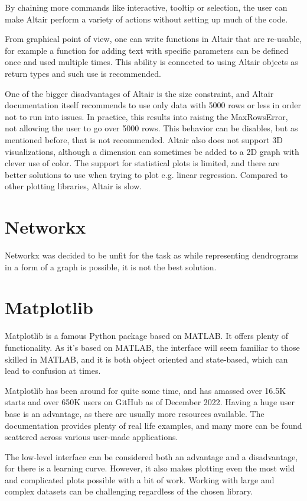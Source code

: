 By chaining more commands like interactive, tooltip or selection, the user can make Altair perform a variety of actions without setting up much of the code. 

From graphical point of view, one can write functions in Altair that are re-usable, for example a function for adding text with specific parameters can be defined once and used multiple times. This ability is connected to using Altair objects as return types and such use is recommended. 

One of the bigger disadvantages of Altair is the size constraint, and Altair documentation itself recommends to use only data with 5000 rows or less in order not to run into issues. In practice, this results into raising the MaxRowsError, not allowing the user to go over 5000 rows. This behavior can be disables, but as mentioned before, that is not recommended. Altair also does not support 3D visualizations, although a dimension can sometimes be added to a 2D graph with clever use of color. The support for statistical plots is limited, and there are better solutions to use when trying to plot e.g. linear regression. Compared to other plotting libraries, Altair is slow. 

\section{Networkx}
\label{sec:networkx}
Networkx was decided to be unfit for the task as while representing dendrograms in a form of a graph is possible, it is not the best solution.

\section{Matplotlib}
\label{sec:matplotlib}
Matplotlib is a famous Python package based on MATLAB. It offers plenty of functionality. As it's based on MATLAB, the interface will seem familiar to those skilled in MATLAB, and it is both object oriented and state-based, which can lead to confusion at times.

Matplotlib has been around for quite some time, and has amassed over 16.5K starts and over 650K users on GitHub as of December 2022. Having a huge user base is an advantage, as there are usually more resources available. The documentation provides plenty of real life examples, and many more can be found scattered across various user-made applications. 

The low-level interface can be considered both an advantage and a disadvantage, for there is a learning curve. However, it also makes plotting even the most wild and complicated plots possible with a bit of work. Working with large and complex datasets can be challenging regardless of the chosen library. 

